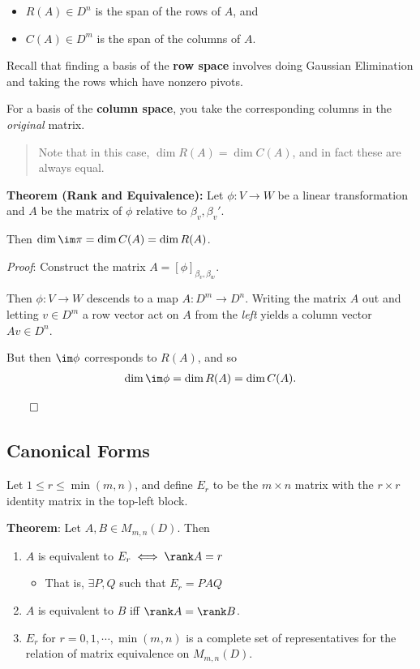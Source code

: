 \begin{itemize}
\item
  \(R(A) \in D^n\) is the span of the rows of \(A\), and
\item
  \(C(A) \in D^m\) is the span of the columns of \(A\).
\end{itemize}

Recall that finding a basis of the \textbf{row space} involves doing
Gaussian Elimination and taking the rows which have nonzero pivots.

For a basis of the \textbf{column space}, you take the corresponding
columns in the \emph{original} matrix.

\begin{quote}
Note that in this case, \(\dim R(A) = \dim C(A)\), and in fact these are
always equal.
\end{quote}

\textbf{Theorem (Rank and Equivalence):} Let \(\phi: V\to W\) be a
linear transformation and \(A\) be the matrix of \(\phi\) relative to
\(\beta_v, \beta_v'\).

Then \(\dim \im \pi = \dim C(A) = \dim R(A)\).

\emph{Proof}: Construct the matrix \(A = [\phi]_{\beta_v, \beta_w}\).

Then \(\phi: V \to W\) descends to a map \(A: D^m \to D^n\). Writing the
matrix \(A\) out and letting \(v\in D^m\) a row vector act on \(A\) from
the \emph{left} yields a column vector \(Av \in D^n\).

But then \(\im \phi\) corresponds to \(R(A)\), and so
\begin{align*}
\dim \im \phi = \dim R(A) = \dim C(A)
.\end{align*}

\(\qed\)

\hypertarget{canonical-forms}{%
\subsection{Canonical Forms}\label{canonical-forms}}

Let \(1 \leq r \leq \min(m, n)\), and define \(E_r\) to be the
\(m\times n\) matrix with the \(r\times r\) identity matrix in the
top-left block.

\textbf{Theorem}: Let \(A, B \in M_{m,n}(D)\). Then

\begin{enumerate}
\def\labelenumi{\arabic{enumi}.}
\item
  \(A\) is equivalent to \(E_r \iff \rank A = r\)

  \begin{itemize}
  \tightlist
  \item
    That is, \(\exists P,Q\) such that \(E_r = PAQ\)
  \end{itemize}
\item
  \(A\) is equivalent to \(B\) iff \(\rank A = \rank B\).
\item
  \(E_r\) for \(r = 0, 1, \cdots, \min(m,n)\) is a complete set of
  representatives for the relation of matrix equivalence on
  \(M_{m, n}(D)\).
\end{enumerate}

